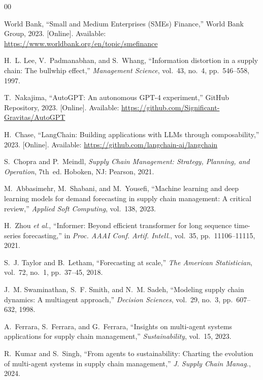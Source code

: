 \documentclass[conference]{IEEEtran}
\begin{document}
\begin{thebibliography}{00}

World Bank, ``Small and Medium Enterprises (SMEs) Finance,'' World Bank Group, 2023. [Online]. Available: \url{https://www.worldbank.org/en/topic/smefinance}

H.~L. Lee, V.~Padmanabhan, and S.~Whang, ``Information distortion in a supply chain: The bullwhip effect,'' \textit{Management Science}, vol.~43, no.~4, pp.~546--558, 1997.

T.~Nakajima, ``AutoGPT: An autonomous GPT-4 experiment,'' GitHub Repository, 2023. [Online]. Available: \url{https://github.com/Significant-Gravitas/AutoGPT}

H.~Chase, ``LangChain: Building applications with LLMs through composability,'' 2023. [Online]. Available: \url{https://github.com/langchain-ai/langchain}

S.~Chopra and P.~Meindl, \textit{Supply Chain Management: Strategy, Planning, and Operation}, 7th~ed. Hoboken, NJ: Pearson, 2021.

M.~Abbasimehr, M.~Shabani, and M.~Yousefi, ``Machine learning and deep learning models for demand forecasting in supply chain management: A critical review,'' \textit{Applied Soft Computing}, vol.~138, 2023.

H.~Zhou \textit{et al.}, ``Informer: Beyond efficient transformer for long sequence time-series forecasting,'' in \textit{Proc. AAAI Conf. Artif. Intell.}, vol.~35, pp.~11106--11115, 2021.

S.~J. Taylor and B.~Letham, ``Forecasting at scale,'' \textit{The American Statistician}, vol.~72, no.~1, pp.~37--45, 2018.

J.~M. Swaminathan, S.~F. Smith, and N.~M. Sadeh, ``Modeling supply chain dynamics: A multiagent approach,'' \textit{Decision Sciences}, vol.~29, no.~3, pp.~607--632, 1998.

A.~Ferrara, S.~Ferrara, and G.~Ferrara, ``Insights on multi-agent systems applications for supply chain management,'' \textit{Sustainability}, vol.~15, 2023.

R.~Kumar and S.~Singh, ``From agents to sustainability: Charting the evolution of multi-agent systems in supply chain management,'' \textit{J. Supply Chain Manag.}, 2024.


\end{thebibliography}
\end{document}
